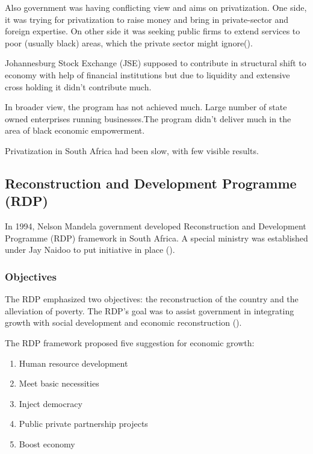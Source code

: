 \documentclass{elsarticle}
\begin{document}
Also government was having conflicting view and aims on privatization. One side, it was trying for privatization to raise money and bring in private-sector and foreign expertise. On other side it was seeking public firms to extend services to poor (usually black) areas, which the private sector might ignore(\cite{Hentz2000}). 

Johannesburg Stock Exchange (JSE) supposed to contribute in structural shift to economy with help of financial institutions but due to liquidity and extensive cross holding it didn't contribute much. 

In broader view, the program has not achieved much. Large number of state owned enterprises running businesses.The program didn't deliver much in the area of black economic empowerment. 

Privatization in South Africa had been slow, with few visible results.

\subsection{Reconstruction and Development Programme (RDP)}

In 1994, Nelson Mandela government developed Reconstruction and Development Programme (RDP) framework in South Africa. A special ministry was established under Jay Naidoo to put initiative in place (\cite{OMalley1998}).

\subsubsection{Objectives}
The RDP emphasized two objectives: the reconstruction of the country and the alleviation of poverty. The RDP's goal was to assist government in integrating growth with social development and economic reconstruction (\cite{Besada2007}).

The RDP framework proposed five suggestion for economic growth: 
\begin{enumerate}
    \item Human resource development
    \item Meet basic necessities
    \item Inject democracy
    \item Public private partnership projects
    \item Boost economy
\end{enumerate}
\end{document}
